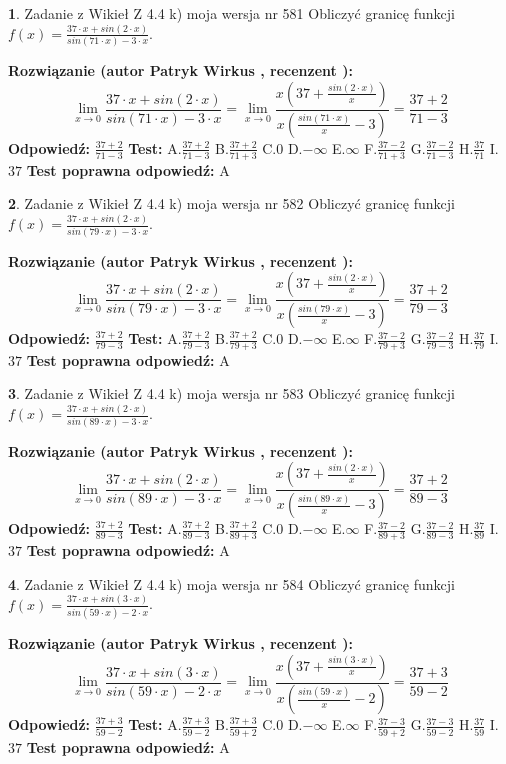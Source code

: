 \documentclass[12pt, a4paper]{article}
\theoremstyle{definition} %
\newtheorem{zad}{}
\newcommand{\zadStart}[1]{\begin{zad}#1\newline}
\newcommand{\zadStop}{\end{zad}}
\newcommand{\rozwStart}[2]{\noindent \textbf{Rozwiązanie (autor #1 , recenzent #2): }\newline}
\newcommand{\rozwStop}{\newline}
\newcommand{\odpStart}{\noindent \textbf{Odpowiedź:}\newline}
\newcommand{\odpStop}{\newline}
\newcommand{\testStart}{\noindent \textbf{Test:}\newline}
\newcommand{\testStop}{\newline}
\newcommand{\kluczStart}{\noindent \textbf{Test poprawna odpowiedź:}\newline}
\newcommand{\kluczStop}{\newline}
\begin{document}
\zadStart{Zadanie z Wikieł Z 4.4 k) moja wersja nr 581}
Obliczyć granicę funkcji $f(x)=\frac{37\cdot x +sin(2\cdot x)}{sin(71\cdot x) -3\cdot x}$.
\zadStop
\rozwStart{Patryk Wirkus}{}
$$\lim\limits_{x\to 0}\frac{37\cdot x +sin(2\cdot x)}{sin(71\cdot x) -3\cdot x}
=\lim\limits_{x\to 0}\frac{x(37+\frac{sin(2\cdot x)}{x})}{x(\frac{sin(71\cdot x)}{x}-3)}
=\frac{37+2}{71-3}$$
\rozwStop
\odpStart
$\frac{37+2}{71-3}$
\odpStop
\testStart
A.$\frac{37+2}{71-3}$
B.$\frac{37+2}{71+3}$
C.$0$
D.$-\infty$
E.$\infty$
F.$\frac{37-2}{71+3}$
G.$\frac{37-2}{71-3}$
H.$\frac{37}{71}$
I.$37$
\testStop
\kluczStart
A
\kluczStop



\zadStart{Zadanie z Wikieł Z 4.4 k) moja wersja nr 582}
Obliczyć granicę funkcji $f(x)=\frac{37\cdot x +sin(2\cdot x)}{sin(79\cdot x) -3\cdot x}$.
\zadStop
\rozwStart{Patryk Wirkus}{}
$$\lim\limits_{x\to 0}\frac{37\cdot x +sin(2\cdot x)}{sin(79\cdot x) -3\cdot x}
=\lim\limits_{x\to 0}\frac{x(37+\frac{sin(2\cdot x)}{x})}{x(\frac{sin(79\cdot x)}{x}-3)}
=\frac{37+2}{79-3}$$
\rozwStop
\odpStart
$\frac{37+2}{79-3}$
\odpStop
\testStart
A.$\frac{37+2}{79-3}$
B.$\frac{37+2}{79+3}$
C.$0$
D.$-\infty$
E.$\infty$
F.$\frac{37-2}{79+3}$
G.$\frac{37-2}{79-3}$
H.$\frac{37}{79}$
I.$37$
\testStop
\kluczStart
A
\kluczStop



\zadStart{Zadanie z Wikieł Z 4.4 k) moja wersja nr 583}
Obliczyć granicę funkcji $f(x)=\frac{37\cdot x +sin(2\cdot x)}{sin(89\cdot x) -3\cdot x}$.
\zadStop
\rozwStart{Patryk Wirkus}{}
$$\lim\limits_{x\to 0}\frac{37\cdot x +sin(2\cdot x)}{sin(89\cdot x) -3\cdot x}
=\lim\limits_{x\to 0}\frac{x(37+\frac{sin(2\cdot x)}{x})}{x(\frac{sin(89\cdot x)}{x}-3)}
=\frac{37+2}{89-3}$$
\rozwStop
\odpStart
$\frac{37+2}{89-3}$
\odpStop
\testStart
A.$\frac{37+2}{89-3}$
B.$\frac{37+2}{89+3}$
C.$0$
D.$-\infty$
E.$\infty$
F.$\frac{37-2}{89+3}$
G.$\frac{37-2}{89-3}$
H.$\frac{37}{89}$
I.$37$
\testStop
\kluczStart
A
\kluczStop



\zadStart{Zadanie z Wikieł Z 4.4 k) moja wersja nr 584}
Obliczyć granicę funkcji $f(x)=\frac{37\cdot x +sin(3\cdot x)}{sin(59\cdot x) -2\cdot x}$.
\zadStop
\rozwStart{Patryk Wirkus}{}
$$\lim\limits_{x\to 0}\frac{37\cdot x +sin(3\cdot x)}{sin(59\cdot x) -2\cdot x}
=\lim\limits_{x\to 0}\frac{x(37+\frac{sin(3\cdot x)}{x})}{x(\frac{sin(59\cdot x)}{x}-2)}
=\frac{37+3}{59-2}$$
\rozwStop
\odpStart
$\frac{37+3}{59-2}$
\odpStop
\testStart
A.$\frac{37+3}{59-2}$
B.$\frac{37+3}{59+2}$
C.$0$
D.$-\infty$
E.$\infty$
F.$\frac{37-3}{59+2}$
G.$\frac{37-3}{59-2}$
H.$\frac{37}{59}$
I.$37$
\testStop
\kluczStart
A
\kluczStop
\end{document}

